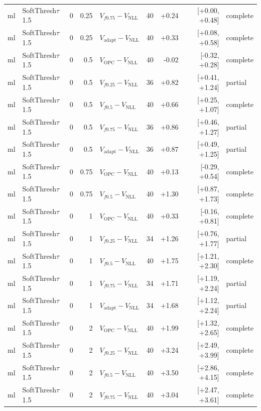 \documentclass[10pt,a4paper]{article}
\begin{document}
{\begin{longtable}{llrrlrrrl}
ml & SoftThresh$\tau$1.5 & 0 & 0.25 & $V_{f0.75}-V_{\mathrm{NLL}}$ & 40 & +0.24 & [+0.00, +0.48] & complete \\
ml & SoftThresh$\tau$1.5 & 0 & 0.25 & $V_{\mathrm{adapt}}-V_{\mathrm{NLL}}$ & 40 & +0.33 & [+0.08, +0.58] & complete \\
ml & SoftThresh$\tau$1.5 & 0 & 0.5 & $V_{\mathrm{OPC}}-V_{\mathrm{NLL}}$ & 40 & -0.02 & [-0.32, +0.28] & complete \\
ml & SoftThresh$\tau$1.5 & 0 & 0.5 & $V_{f0.25}-V_{\mathrm{NLL}}$ & 36 & +0.82 & [+0.41, +1.24] & partial \\
ml & SoftThresh$\tau$1.5 & 0 & 0.5 & $V_{f0.5}-V_{\mathrm{NLL}}$ & 40 & +0.66 & [+0.25, +1.07] & complete \\
ml & SoftThresh$\tau$1.5 & 0 & 0.5 & $V_{f0.75}-V_{\mathrm{NLL}}$ & 36 & +0.86 & [+0.46, +1.27] & partial \\
ml & SoftThresh$\tau$1.5 & 0 & 0.5 & $V_{\mathrm{adapt}}-V_{\mathrm{NLL}}$ & 36 & +0.87 & [+0.49, +1.25] & partial \\
ml & SoftThresh$\tau$1.5 & 0 & 0.75 & $V_{\mathrm{OPC}}-V_{\mathrm{NLL}}$ & 40 & +0.13 & [-0.29, +0.54] & complete \\
ml & SoftThresh$\tau$1.5 & 0 & 0.75 & $V_{f0.5}-V_{\mathrm{NLL}}$ & 40 & +1.30 & [+0.87, +1.73] & complete \\
ml & SoftThresh$\tau$1.5 & 0 & 1 & $V_{\mathrm{OPC}}-V_{\mathrm{NLL}}$ & 40 & +0.33 & [-0.16, +0.81] & complete \\
ml & SoftThresh$\tau$1.5 & 0 & 1 & $V_{f0.25}-V_{\mathrm{NLL}}$ & 34 & +1.26 & [+0.76, +1.77] & partial \\
ml & SoftThresh$\tau$1.5 & 0 & 1 & $V_{f0.5}-V_{\mathrm{NLL}}$ & 40 & +1.75 & [+1.21, +2.30] & complete \\
ml & SoftThresh$\tau$1.5 & 0 & 1 & $V_{f0.75}-V_{\mathrm{NLL}}$ & 34 & +1.71 & [+1.19, +2.24] & partial \\
ml & SoftThresh$\tau$1.5 & 0 & 1 & $V_{\mathrm{adapt}}-V_{\mathrm{NLL}}$ & 34 & +1.68 & [+1.12, +2.24] & partial \\
ml & SoftThresh$\tau$1.5 & 0 & 2 & $V_{\mathrm{OPC}}-V_{\mathrm{NLL}}$ & 40 & +1.99 & [+1.32, +2.65] & complete \\
ml & SoftThresh$\tau$1.5 & 0 & 2 & $V_{f0.25}-V_{\mathrm{NLL}}$ & 40 & +3.24 & [+2.49, +3.99] & complete \\
ml & SoftThresh$\tau$1.5 & 0 & 2 & $V_{f0.5}-V_{\mathrm{NLL}}$ & 40 & +3.50 & [+2.86, +4.15] & complete \\
ml & SoftThresh$\tau$1.5 & 0 & 2 & $V_{f0.75}-V_{\mathrm{NLL}}$ & 40 & +3.04 & [+2.47, +3.61] & complete \\

\end{longtable}}
\end{document}
